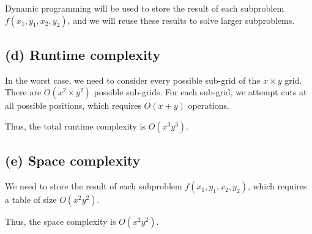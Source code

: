 \documentclass[11pt]{article}
\begin{document}
Dynamic programming will be used to store the result of each subproblem \( f(x_1, y_1, x_2, y_2) \), and we will reuse these results to solve larger subproblems.

\subsection*{(d) Runtime complexity}

In the worst case, we need to consider every possible sub-grid of the \( x \times y \) grid. There are \( O(x^2 \times y^2) \) possible sub-grids. For each sub-grid, we attempt cuts at all possible positions, which requires \( O(x + y) \) operations.

Thus, the total runtime complexity is \( O(x^3 y^3) \).

\subsection*{(e) Space complexity}

We need to store the result of each subproblem \( f(x_1, y_1, x_2, y_2) \), which requires a table of size \( O(x^2 y^2) \).

Thus, the space complexity is \( O(x^2 y^2) \).
\end{document}
